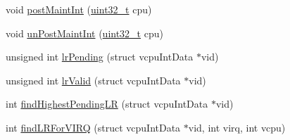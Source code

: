 \begin{DoxyCompactItemize}
void \hyperlink{classVGic_ad86c8e2cfb589fee04dfc050013963af}{postMaintInt} (\hyperlink{Type_8hh_a435d1572bf3f880d55459d9805097f62}{uint32\_\-t} cpu)
\item 
void \hyperlink{classVGic_ae2afe0f63a211fe5f6cc56bbe8b4d79a}{unPostMaintInt} (\hyperlink{Type_8hh_a435d1572bf3f880d55459d9805097f62}{uint32\_\-t} cpu)
\item 
unsigned int \hyperlink{classVGic_ae75cd8cf3bee8ac63664bc65d393bee8}{lrPending} (struct vcpuIntData $\ast$vid)
\item 
unsigned int \hyperlink{classVGic_acd87d736497b629fc35abea04a8d838e}{lrValid} (struct vcpuIntData $\ast$vid)
\item 
int \hyperlink{classVGic_ac8cda0aa85dee9a4e2f352b46d5efea8}{findHighestPendingLR} (struct vcpuIntData $\ast$vid)
\item 
int \hyperlink{classVGic_a8498dbf7b539714834568e7284487cbe}{findLRForVIRQ} (struct vcpuIntData $\ast$vid, int virq, int vcpu)
\end{DoxyCompactItemize}
